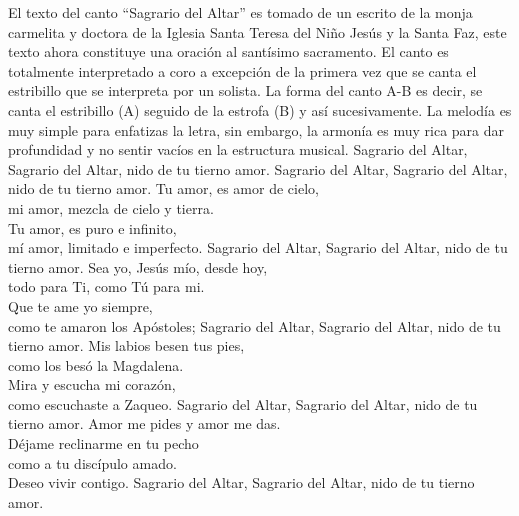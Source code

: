 \documentclass[12pt, letterpaper]{report}
\begin{document}
    \Large El texto del canto ``Sagrario del Altar'' es tomado de un escrito de la monja carmelita y
    doctora de la Iglesia Santa Teresa del Ni\~no Jes\'us y la Santa Faz, este texto ahora constituye una
    oraci\'on al sant\'isimo sacramento. El canto es totalmente interpretado a coro a excepci\'on de la
    primera vez que se canta el estribillo que se interpreta por un solista. La forma del canto A-B
    es decir, se canta el estribillo (A) seguido de la estrofa (B) y as\'i sucesivamente. La melod\'ia es
    muy simple para enfatizas la letra, sin embargo, la armon\'ia es muy rica para dar profundidad y no
    sentir vac\'ios en la estructura musical.
    \newline
    \noindent
    \LARGE Sagrario del Altar, Sagrario del Altar, nido de tu tierno amor.
    \newline
    \noindent
    \LARGE Sagrario del Altar, Sagrario del Altar, nido de tu tierno amor.
    \newline
    \noindent
    Tu amor, es amor de cielo,\\
    mi amor, mezcla de cielo y tierra.\\
    Tu amor, es puro e infinito,\\
    m\'i amor, limitado e imperfecto.
    \newline
    \noindent
    Sagrario del Altar, Sagrario del Altar, nido de tu tierno amor.
    \newline
    \noindent
    Sea yo, Jes\'us m\'io, desde hoy,\\
    todo para Ti, como T\'u para mi.\\
    Que te ame yo siempre,\\
    como te amaron los Ap\'ostoles;
    \newline
    \noindent
    Sagrario del Altar, Sagrario del Altar, nido de tu tierno amor.
    \newline
    \noindent
    Mis labios besen tus pies,\\
    como los bes\'o la Magdalena.\\
    Mira y escucha mi coraz\'on,\\
    como escuchaste a Zaqueo.
    \newline
    \noindent
    Sagrario del Altar, Sagrario del Altar, nido de tu tierno amor.
    \newline
    \noindent
    Amor me pides y amor me das.\\
    D\'ejame reclinarme en tu pecho\\
    como a tu disc\'ipulo amado.\\
    Deseo vivir contigo.
    \newline
    \noindent
    Sagrario del Altar, Sagrario del Altar, nido de tu tierno amor.\\
\end{document}
